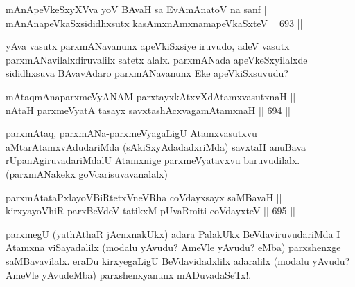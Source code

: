 
\begin{shl}
mAnApeVkeSxyXVva yoV BAvaH sa EvAmAnatoV na sanf || \\
mAnAnapeVkaSxsididhxsutx kasAmxnAmxnamapeVkaSxteV \hfill || 693 ||  
\end{shl}

\begin{artha} 
yAva vasutx parxmANavanunx apeVkiSxsiye iruvudo, adeV vasutx parxmANavilalxdiruvalilx satetx alalx. parxmANada apeVkeSxyilalxde sididhxsuva BAvavAdaro parxmANavanunx Eke apeVkiSxsuvudu?
\end{artha}


\begin{shl}
mAtaqmAnaparxmeVyANAM parxtayxkAtxvXdAtamxvasutxnaH || \\
nAtaH parxmeVyatA tasayx savxtashAcxvagamAtamxnaH \hfill || 694 ||  
\end{shl}

\begin{artha} 
parxmAtaq, parxmANa-parxmeVyagaLigU Atamxvasutxvu 
aMtarAtamxvAdudariMda (sAkiSxyAdadadxriMda) savxtaH anuBava 
rUpanAgiruvadariMdalU Atamxnige parxmeVyatavxvu baruvudilalx. 
(parxmANakekx goVcarisuvavanalalx)
\end{artha}


\begin{shl}
parxmAtataPxlayoVBiRtetxVneVRha coVdayxsayx saMBavaH || \\
kirxyayoVhiR parxBeVdeV tatikxM pUvaRmiti coVdayxteV \hfill || 695 ||  
\end{shl}

\begin{artha} 
parxmegU (yathAthaR jAcnxnakUkx) adara PalakUkx 
BeVdaviruvudariMda I Atamxna viSayadalilx (modalu yAvudu? AmeVle 
yAvudu? eMba) parxshenxge saMBavavilalx. eraDu kirxyegaLigU 
BeVdavidadxlilx adaralilx (modalu yAvudu? AmeVle yAvudeMba) 
parxshenxyanunx mADuvadaSeTx!.
\end{artha}

